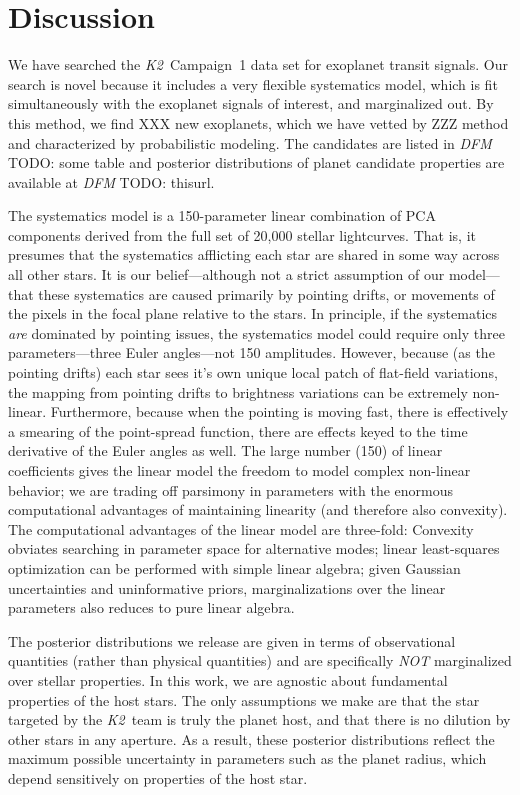 \documentclass[12pt,preprint]{aastex}
\newcommand{\project}[1]{\textsl{#1}} %
\newcommand{\KT}{\project{K2}}
\newcommand{\todo}[3]{{\color{#2} \emph{#1} TODO: #3}}
\newcommand{\dfmtodo}[1]{\todo{DFM}{red}{#1}}
\begin{document}
\section{Discussion}

We have searched the \KT\ Campaign~1 data set for exoplanet transit signals.
Our search is novel because it includes a very flexible systematics model,
which is fit simultaneously with the exoplanet signals of interest, and
marginalized out.
By this method, we find XXX new exoplanets, which we have vetted by ZZZ
method and characterized by probabilistic modeling.
The candidates are listed in \dfmtodo{some table} and
posterior distributions of planet candidate properties are available at
\dfmtodo{thisurl}.

The systematics model is a 150-parameter linear combination of PCA components
derived from the full set of 20,000 stellar lightcurves.
That is, it presumes that the systematics afflicting each star are shared in
some way across all other stars.
It is our belief---although not a strict assumption of our model---that these
systematics are caused primarily by pointing drifts, or movements of the
pixels in the focal plane relative to the stars.
In principle, if the systematics \emph{are} dominated by pointing issues, the
systematics model could require only three parameters---three Euler
angles---not 150 amplitudes.
However, because (as the pointing drifts) each star sees it's own unique
local patch of flat-field variations, the mapping from pointing drifts to
brightness variations can be extremely non-linear.
Furthermore, because when the pointing is moving fast, there is effectively
a smearing of the point-spread function, there are effects keyed to the
time derivative of the Euler angles as well.
The large number (150) of linear coefficients gives the linear model the
freedom to model complex non-linear behavior; we are trading off parsimony
in parameters with the enormous computational advantages of maintaining
linearity (and therefore also convexity).
The computational advantages of the linear model are three-fold:
Convexity obviates searching in parameter space for alternative modes;
linear least-squares optimization can be performed with simple linear algebra;
given Gaussian uncertainties and uninformative priors, marginalizations over
the linear parameters also reduces to pure linear algebra.

The posterior distributions we release are given in terms of observational
quantities (rather than physical quantities) and are specifically \emph{NOT}
marginalized over stellar properties.
In this work, we are agnostic about fundamental properties of the host stars.
The only assumptions we make are that the star targeted by the \KT\
team is truly the planet host, and that there is no dilution by other stars in
any aperture.
As a result, these posterior distributions reflect the maximum possible
uncertainty in parameters such as the planet radius, which depend sensitively
on properties of the host star.
\end{document}
